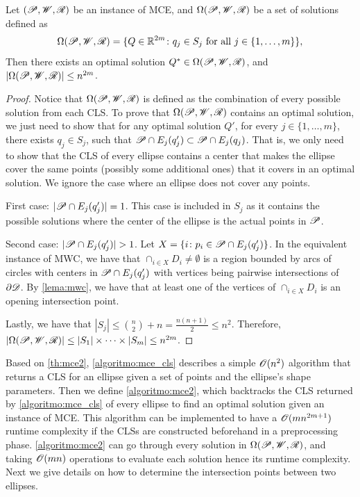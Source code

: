 \begin{theorem}\label{th:mce2}
	Let $(\mathscr{P}, \mathscr{W}, \mathscr{R})$ be an instance of MCE, and $\Omega(\mathscr{P}, \mathscr{W}, \mathscr{R})$ be a set of solutions defined as 
	\begin{equation*}\label{eq:omega2}
		\Omega(\mathscr{P}, \mathscr{W}, \mathscr{R}) = \{Q\in \mathbb{R}^{2m} \colon q_j \in S_j \textnormal{ for all } j\in\{1, \dots, m\}\},
	\end{equation*}
	Then there exists an optimal solution $Q^*\in \Omega(\mathscr{P}, \mathscr{W}, \mathscr{R})$, and $|\Omega(\mathscr{P}, \mathscr{W}, \mathscr{R})|\le n^{2m}$.
\end{theorem}
\begin{proof}
		Notice that $\Omega(\mathscr{P}, \mathscr{W}, \mathscr{R})$ is defined as the combination of every possible solution from each CLS. 
		To prove that $\Omega(\mathscr{P}, \mathscr{W}, \mathscr{R})$ contains an optimal solution, we just need to show that for any optimal solution $Q'$, for every $j \in \{1, \dots, m\}$, there exists $q_j \in S_j$, such that $\mathscr{P} \cap E_j(q_j') \subset \mathscr{P} \cap E_j(q_j)$.
		That is, we only need to show that the CLS of every ellipse contains a center that makes the ellipse cover the same points (possibly some additional ones) that it covers in an optimal solution.
		We ignore the case where an ellipse does not cover any points.
		
		First case: $|\mathscr{P} \cap E_j(q_j')|=1$. This case is included in $S_j$ as it contains the possible solutions where the center of the ellipse is the actual points in $\mathscr{P}$.
		
		Second case: $|\mathscr{P} \cap E_j(q_j')| > 1$. Let $X = \{i \colon p_i \in \mathscr{P} \cap E_j(q_j')\}$. In the equivalent instance of MWC, we have that $\cap_{i\in X} D_i \neq \emptyset$ is a region bounded by arcs of circles with centers in $\mathscr{P} \cap E_j(q_j')$ with vertices being pairwise intersections of $\partial \mathscr{D}$. By \autoref{lema:mwc}, we have that at least one of the vertices of $\cap_{i\in X} D_i$ is an opening intersection point.
		
		Lastly, we have that $|S_j| \le \binom{n}{2} + n = \frac{n(n+1)}{2} \le n^2$. Therefore,
		$|\Omega(\mathscr{P}, \mathscr{W}, \mathscr{R})| \le |S_1|\times \dots \times |S_m| \le n^{2m}$.
\end{proof}

Based on \autoref{th:mce2}, \autoref{algoritmo:mce_cls} describes a simple $\mathscr{O}(n^2)$ algorithm that returns a CLS for an ellipse given a set of points and the ellipse's shape parameters. 
Then we define \autoref{algoritmo:mce2}, which backtracks the CLS returned by \autoref{algoritmo:mce_cls} of every ellipse to find an optimal solution given an instance of MCE. This algorithm can be implemented to have a $\mathscr{O}(mn^{2m+1})$ runtime complexity if the CLSs are constructed beforehand in a preprocessing phase. 
\autoref{algoritmo:mce2} can go through every solution in $\Omega(\mathscr{P}, \mathscr{W}, \mathscr{R})$, and taking $\mathscr{O}(mn)$ operations to evaluate each solution hence its runtime complexity.
Next we give details on how to determine the intersection points between two ellipses.

